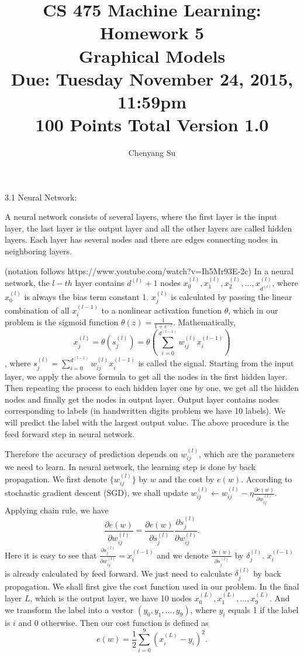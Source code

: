 \documentclass[11pt]{article}
\title{CS 475 Machine Learning: Homework 5\\Graphical Models\\
\Large{Due: Tuesday November 24, 2015, 11:59pm}\\
100 Points Total \hspace{1cm} Version 1.0}
\author{Chenyang Su}
\date{}
\begin{document}
\large
\maketitle
\thispagestyle{headings}

\vspace{-.5in}


3.1 Neural Network:

A neural network consists of several layers, where the first layer is the input layer, the last layer is the output layer and all the other layers are called hidden layers. Each layer has several nodes and there are edges connecting nodes in neighboring layers. 

(notation follows https://www.youtube.com/watch?v=Ih5Mr93E-2c)
In a neural network, the $l-th$ layer contains $d^{(l)}+1$ nodes $x_0^{(l)},x_1^{(l)},x_2^{(l)},...,x_{d^{(l)}}^{(l)}$, where $x_0^{(l)}$ is always the bias term constant 1. $x_j^{(l)}$ is calculated by passing the linear combination of all $x_i^{(l-1)}$ to a nonlinear activation function $\theta$, which in our problem is the sigmoid function $\theta(z)=\frac{1}{1+e^{-z}}$. Mathematically,
$$x_j^{(l)}=\theta(s_j^{(l)})=\theta\left(\sum_{i=0}^{d^{(l-1)}}w_{ij}^{(l)}x_i^{(l-1)}\right)$$,
where $s_j^{(l)}=\sum_{i=0}^{d^{(l-1)}}w_{ij}^{(l)}x_i^{(l-1)}$ is called the signal. Starting from the input layer, we apply the above formula to get all the nodes in the first hidden layer. Then repeating the process to each hidden layer one by one, we get all the hidden nodes and finally get the nodes in output layer. Output layer contains nodes corresponding to labels (in handwritten digits problem we have 10 labels). We will predict the label with the largest output value. The above procedure is the feed forward step in neural network. 

Therefore the accuracy of prediction depends on $w_{ij}^{(l)}$, which are the parameters we need to learn. In neural network, the learning step is done by back propagation. We first denote $\{w_{ij}^{(l)}\}$ by $w$ and the cost by $e(w)$. According to stochastic gradient descent (SGD), we shall update $w_{ij}^{(l)}\gets w_{ij}^{(l)}-\eta\frac{\partial e(w)}{\partial w_{ij}^{(l)}}$. Applying chain rule, we have
$$\frac{\partial e(w)}{\partial w_{ij}^{(l)}}=\frac{\partial e(w)}{\partial s_j^{(l)}}\frac{\partial s_j^{(l)}}{\partial w_{ij}^{(l)}}.$$
Here it is easy to see that $\frac{\partial s_j^{(l)}}{\partial w_{ij}^{(l)}}=x_i^{(l-1)}$ and we denote $\frac{\partial e(w)}{\partial s_j^{(l)}}$ by $\delta_j^{(l)}$. $x_i^{(l-1)}$ is already calculated by feed forward. We just need to calculate $\delta_j^{(l)}$ by back propagation. We shall first give the cost function used in our problem. In the final layer $L$, which is the output layer, we have 10 nodes $x_0^{(L)},x_1^{(L)},...,x_{9}^{(L)}$. And we transform the label into a vector $(y_0,y_1,...,y_{9})$, where $y_i$ equals 1 if the label is $i$ and 0 otherwise. Then our cost function is defined as 
$$e(w)=\frac{1}{2}\sum_{i=0}^{9}(x_i^{(L)}-y_i)^2.$$
\end{document}
